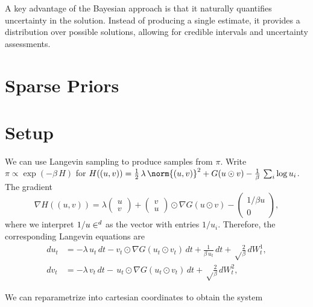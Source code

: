 \documentclass{article}
\begin{document}
A key advantage of the Bayesian approach is that it naturally quantifies uncertainty in the solution. Instead of producing a single estimate, it provides a distribution over possible solutions, allowing for credible intervals and uncertainty assessments.

\section{Sparse Priors}

\section{Setup}
We can use Langevin sampling to produce samples from $\pi$. Write $\pi\propto\exp(-\beta\, H)$ for $H((u,v))=\frac 12 \,\lambda\, \norm{(u,v)}^2 + G(u\odot v)- \frac{1}{\beta}\,\sum_i\log u_i$. The gradient
\[
\nabla H((u,v))=\lambda\begin{pmatrix}
    u\\v
\end{pmatrix}
+\begin{pmatrix}
    v\\ u
\end{pmatrix}\odot \nabla G(u\odot v)
-\begin{pmatrix}
    1/\beta u\\ 0
\end{pmatrix},
\]
where we interpret $1/u\in\real^d$ as the vector with entries $1/u_i$. Therefore, the corresponding Langevin equations are 
\begin{equation} \label{uvproc}
\begin{split}
du_t&=-\lambda\,   u_t\,dt - v_t\odot \nabla G(u_t\odot v_t)\,dt
 +\frac{1}{\beta \,u_t}\,dt+ \sqrt\frac{2}{\beta}\,dW^1_t,\\
dv_t&=-\lambda\,  v_t\,dt -  \,u_t \odot \nabla G(u_t\odot v_t)\,dt+  \sqrt\frac{2}{\beta}\,dW^2_t,
\label{uvproc}
\end{split}
\end{equation}

We can reparametrize into cartesian coordinates to obtain the system
\end{document}
